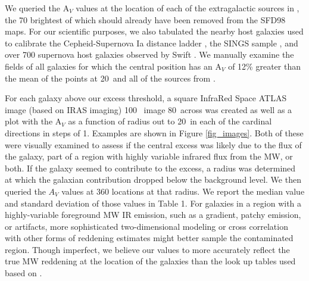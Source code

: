 \documentclass[twocolumn]{aastex63}
\begin{document}
We queried the A$_V$ values at the location of each of the extragalactic sources in \citet{Rice_etal_1988}, the 70 brightest of which should already have been removed from the SFD98 maps.  For our scientific purposes, we also tabulated the nearby host galaxies used to calibrate the Cepheid-Supernova Ia distance ladder \citep{Riess_etal_2016}, the SINGS sample \citep{Kennicutt_etal_2003}, and over 700 supernova host galaxies observed by Swift \citep{Brown_etal_2014_SOUSA}.   We manually examine the fields of all galaxies for which the central position has an A$_V$ of 12\% greater than the mean of the points at 20\arcmin~and all of the sources from \citet{Rice_etal_1988}.


For each galaxy above our excess threshold, a square InfraRed Space ATLAS image (based on IRAS imaging) 100 \micron\ image  80\arcmin\ across was created as well as a plot with the A$_V$ as a function of radius out to 20\arcmin\ in each of the cardinal directions in steps of 1\arcmin.  Examples are shown in Figure \ref{fig_images}.
Both of these were visually examined to assess if the central excess was likely due to the flux of the galaxy, part of a region with highly variable infrared flux from the MW, or both.  
If the galaxy seemed to contribute to the excess, a radius was determined at which the galaxian contribution dropped below the background level.  We then queried the $A_V$ values at 360 locations at that radius.  We report the median value and standard deviation of those values in Table 1.   For galaxies in a region with a highly-variable foreground MW IR emission, such as a gradient, patchy emission, or artifacts, more sophisticated two-dimensional modeling or cross correlation with other forms of reddening estimates might better sample the contaminated region. 
Though imperfect, we believe our values to more accurately reflect the true MW reddening at the location of the galaxies than the look up tables used based on \citet{Schlegel_etal_1998}.  
\end{document}
